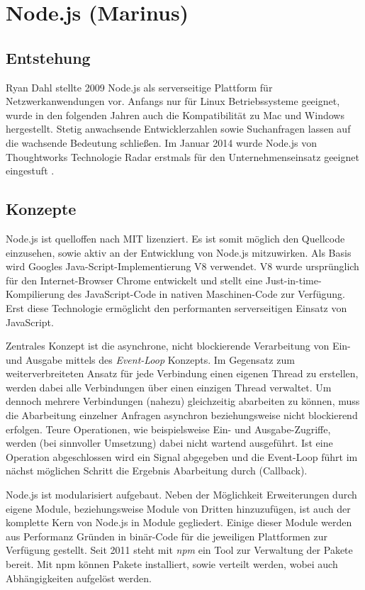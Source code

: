 \chapter{Node.js (Marinus)}\label{node.js-marinus}

\section{Entstehung}\label{entstehung}

Ryan Dahl stellte 2009 Node.js als serverseitige Plattform für
Netzwerkanwendungen vor. Anfangs nur für Linux Betriebssysteme geeignet,
wurde in den folgenden Jahren auch die Kompatibilität zu Mac und Windows
hergestellt. Stetig anwachsende Entwicklerzahlen \cite{github-nodejs}
sowie Suchanfragen \cite{google-trend-nodejs} lassen auf die
wachsende Bedeutung schließen. Im Januar 2014 wurde Node.js von
Thoughtworks Technologie Radar erstmals für den Unternehmenseinsatz
geeignet eingestuft \cite{thoughtworks-node}.

\section{Konzepte}\label{konzepte-1}

Node.js ist quelloffen nach MIT lizenziert. Es ist somit möglich den
Quellcode einzusehen, sowie aktiv an der Entwicklung von Node.js
mitzuwirken. Als Basis wird Googles Java-Script-Implementierung V8
verwendet. V8 wurde ursprünglich für den Internet-Browser Chrome
entwickelt und stellt eine Just-in-time-Kompilierung des JavaScript-Code
in nativen Maschinen-Code zur Verfügung. Erst diese Technologie
ermöglicht den performanten serverseitigen Einsatz von JavaScript.

Zentrales Konzept ist die asynchrone, nicht blockierende Verarbeitung
von Ein- und Ausgabe mittels des \emph{Event-Loop} Konzepts. Im Gegensatz
zum weiterverbreiteten Ansatz für jede Verbindung einen eigenen Thread
zu erstellen, werden dabei alle Verbindungen über einen einzigen Thread
verwaltet. Um dennoch mehrere Verbindungen (nahezu) gleichzeitig
abarbeiten zu können, muss die Abarbeitung einzelner Anfragen asynchron
beziehungsweise nicht blockierend erfolgen. Teure Operationen, wie
beispielsweise Ein- und Ausgabe-Zugriffe, werden (bei sinnvoller Umsetzung) dabei
nicht wartend ausgeführt. Ist eine Operation abgeschlossen wird ein
Signal abgegeben und die Event-Loop führt im nächst möglichen Schritt
die Ergebnis Abarbeitung durch (Callback).

Node.js ist modularisiert aufgebaut. Neben der Möglichkeit Erweiterungen
durch eigene Module, beziehungsweise Module von Dritten hinzuzufügen,
ist auch der komplette Kern von Node.js in Module gegliedert. Einige
dieser Module werden aus Performanz Gründen in binär-Code für die
jeweiligen Plattformen zur Verfügung gestellt. Seit 2011 steht mit
\emph{npm} ein Tool zur Verwaltung der Pakete bereit. Mit npm können Pakete
installiert, sowie verteilt werden, wobei auch Abhängigkeiten aufgelöst
werden.

